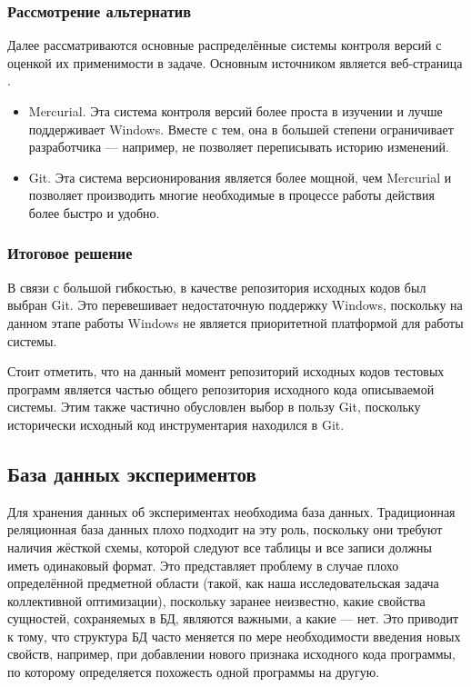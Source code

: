 \subsubsection{Рассмотрение альтернатив}
Далее рассматриваются основные распределённые системы контроля версий с оценкой их применимости в задаче. Основным источником является веб-страница \cite{git-vs-hg}.
\begin{itemize}
    \item {Mercurial}. Эта система контроля версий более проста в изучении и лучше поддерживает Windows. Вместе с тем, она в большей степени ограничивает разработчика --- например, не позволяет переписывать историю изменений.
    \item {Git}. Эта система версионирования является более мощной, чем {Mercurial} и позволяет производить многие необходимые в процессе работы действия более быстро и удобно.
\end{itemize}

\subsubsection{Итоговое решение}
В связи с большой гибкостью, в качестве репозитория исходных кодов был выбран {Git}. Это перевешивает недостаточную поддержку Windows, поскольку на данном этапе работы Windows не является приоритетной платформой для работы системы.

Стоит отметить, что на данный момент репозиторий исходных кодов тестовых программ является частью общего репозитория исходного кода описываемой системы. Этим также частично обусловлен выбор в пользу {Git}, поскольку исторически исходный код инструментария находился в {Git}.


\subsection{База данных экспериментов}
Для хранения данных об экспериментах необходима база данных. Традиционная реляционная база данных плохо подходит на эту роль, поскольку они требуют наличия жёсткой схемы, которой следуют все таблицы и все записи должны иметь одинаковый формат. Это представляет проблему в случае плохо определённой предметной области (такой, как наша исследовательская задача коллективной оптимизации), поскольку заранее неизвестно, какие свойства сущностей, сохраняемых в БД, являются важными, а какие --- нет. Это приводит к тому, что структура БД часто меняется по мере необходимости введения новых свойств, например, при добавлении нового признака исходного кода программы, по которому определяется похожесть одной программы на другую.

